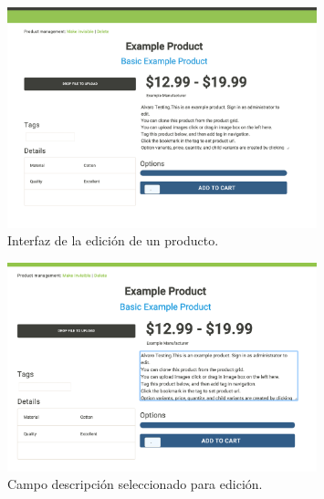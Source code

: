 		\begin{figure}[H]
			\centering
			\includegraphics[width=0.8\textwidth]{figuras/productos/interfaz_edicion_producto.png}

			\caption{Interfaz de la edición de un producto.}
			\label{figure:features:interfaz_edicion_producto}
		\end{figure}

		\begin{figure}[H]
			\centering
			\includegraphics[width=0.8\textwidth]{figuras/productos/interfaz_edicion_editando_description.png}

			\caption{Campo descripción seleccionado para edición.}
			\label{figure:features:interfaz_edicion_editando_description}
		\end{figure}


